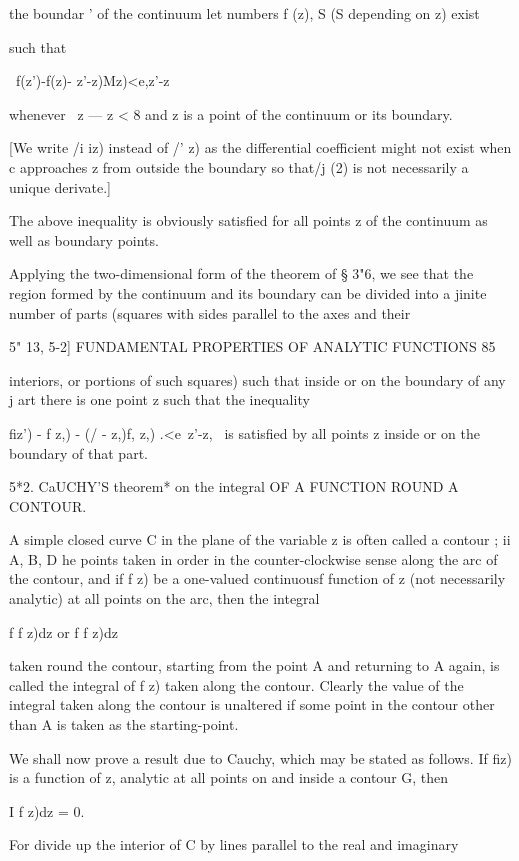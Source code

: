 the boundar ' of the continuum let numbers f (z), S (S depending on z) exist 

such that 

\ f(z')-f(z)- z'-z)Mz)<e,z'-z\ 

whenever \ z — z < 8 and z is a point of the continuum or its boundary. 

[We write /i iz) instead of /'  z) as the differential coefficient might not exist when 
c approaches z from outside the boundary so that/j (2) is not necessarily a unique derivate.] 

The above inequality is obviously satisfied for all points z of the continuum 
as well as boundary points. 

Applying the two-dimensional form of the theorem of § 3"6, we see that 
the region formed by the continuum and its boundary can be divided into 
a jinite number of parts (squares with sides parallel to the axes and their 



5" 13, 5-2] FUNDAMENTAL PROPERTIES OF ANALYTIC FUNCTIONS 85 

interiors, or portions of such squares) such that inside or on the boundary of 
any j art there is one point z  such that the inequality 

fiz') - f z,) - (/ - z,)f,  z,) .<e\ z'-z, \ 
is satisfied by all points z inside or on the boundary of that part. 

5*2. CaUCHY'S theorem* on the integral OF A FUNCTION ROUND A 
CONTOUR. 

A simple closed curve C in the plane of the variable z is often called 
a contour ; ii A, B, D he points taken in order in the counter-clockwise sense 
along the arc of the contour, and if f z) be a one-valued continuousf 
function of z (not necessarily analytic) at all points on the arc, then the 
integral 

f f z)dz or f f z)dz 

taken round the contour, starting from the point A and returning to A again, 
is called the integral of f z) taken along the contour. Clearly the value of the 
integral taken along the contour is unaltered if some point in the contour 
other than A is taken as the starting-point. 

We shall now prove a result due to Cauchy, which may be stated as 
follows. If fiz) is a function of z, analytic at all points on  and inside a 
contour G, then 

I f z)dz = 0. 

For divide up the interior of C by lines parallel to the real and imaginary 

